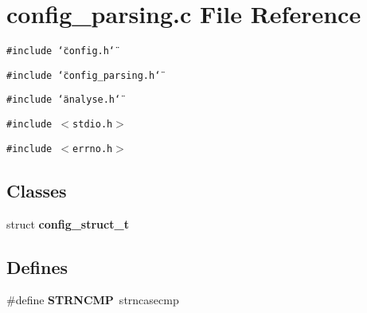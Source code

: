 \section{config\_\-parsing.c File Reference}
\label{config__parsing_8c}
{\tt \#include \char`\"{}config.h\char`\"{}}\par
{\tt \#include \char`\"{}config\_\-parsing.h\char`\"{}}\par
{\tt \#include \char`\"{}analyse.h\char`\"{}}\par
{\tt \#include $<$stdio.h$>$}\par
{\tt \#include $<$errno.h$>$}\par
\subsection*{Classes}
\begin{CompactItemize}
\item 
struct {\bf config\_\-struct\_\-t}
\end{CompactItemize}
\subsection*{Defines}
\begin{CompactItemize}
\item 
\#define {\bf STRNCMP}~strncasecmp
\end{CompactItemize}
